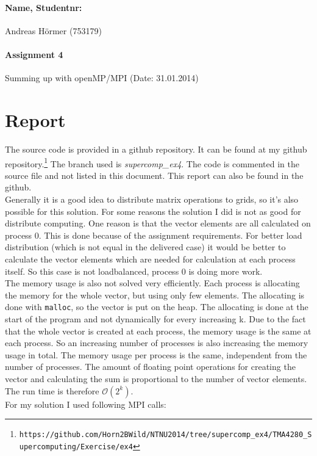\documentclass{article}
\begin{document}
\paragraph{Name, Studentnr: }Andreas H\"ormer (753179)
\paragraph{Assignment 4}Summing up with openMP/MPI (Date: 31.01.2014)

	\section{Report}
		The source code is provided in a github repository. It can be found at my github repository.\footnote{\texttt{https://github.com/Horn2BWild/NTNU2014/tree/supercomp\_ex4/TMA4280\_Supercomputing/Exercise/ex4}} The branch used is \textit{supercomp\_ex4}. The code is commented in the source file and not listed in this document. This report can also be found in the github.\\
		Generally it is a good idea to distribute matrix operations to grids, so it's also possible for this solution. For some reasons the solution I did is not as good for distribute computing. One reason is that the vector elements are all calculated on process 0. This is done because of the assignment requirements. For better load distribution (which is not equal in the delivered case) it would be better to calculate the vector elements which are needed for calculation at each process itself. So this case is not loadbalanced, process 0 is doing more work.\\
The memory usage is also not solved very efficiently. Each process is allocating the memory for the whole vector, but using only few elements. The allocating is done with \texttt{malloc}, so the vector is put on the heap. The allocating is done at the start of the program and not dynamically for every increasing k. Due to the fact that the whole vector is created at each process, the memory usage is the same at each process. So an increasing number of processes is also increasing the memory usage in total. The memory usage per process is the same, independent from the number of processes. 
The amount of floating point operations for creating the vector and calculating the sum is proportional to the number of vector elements. The run time is therefore $\mathcal{O}(2^k)$.\\
For my solution I used following MPI calls:
\end{document}
